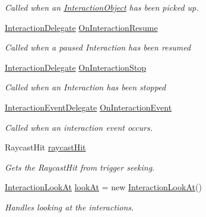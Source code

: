 \begin{DoxyCompactItemize}
\begin{DoxyCompactList}\small\item\em Called when an \mbox{\hyperlink{class_root_motion_1_1_final_i_k_1_1_interaction_object}{Interaction\+Object}} has been picked up. \end{DoxyCompactList}\item 
\mbox{\hyperlink{class_root_motion_1_1_final_i_k_1_1_interaction_system_aa5a8c5136773b4244ab8f7ce707620b7}{Interaction\+Delegate}} \mbox{\hyperlink{class_root_motion_1_1_final_i_k_1_1_interaction_system_a2310c0a686686871aebdce9e8a2cc425}{On\+Interaction\+Resume}}
\begin{DoxyCompactList}\small\item\em Called when a paused Interaction has been resumed \end{DoxyCompactList}\item 
\mbox{\hyperlink{class_root_motion_1_1_final_i_k_1_1_interaction_system_aa5a8c5136773b4244ab8f7ce707620b7}{Interaction\+Delegate}} \mbox{\hyperlink{class_root_motion_1_1_final_i_k_1_1_interaction_system_ac72563333f0d5ca6a76f2ee0662a4b09}{On\+Interaction\+Stop}}
\begin{DoxyCompactList}\small\item\em Called when an Interaction has been stopped \end{DoxyCompactList}\item 
\mbox{\hyperlink{class_root_motion_1_1_final_i_k_1_1_interaction_system_ae04cc230b351d4b73458372899d3f6d8}{Interaction\+Event\+Delegate}} \mbox{\hyperlink{class_root_motion_1_1_final_i_k_1_1_interaction_system_a58f3fbe2e590a55017cb49cfb8de7ebb}{On\+Interaction\+Event}}
\begin{DoxyCompactList}\small\item\em Called when an interaction event occurs. \end{DoxyCompactList}\item 
Raycast\+Hit \mbox{\hyperlink{class_root_motion_1_1_final_i_k_1_1_interaction_system_af84367979dcf4ca8adcde2c6d07e55c5}{raycast\+Hit}}
\begin{DoxyCompactList}\small\item\em Gets the Raycast\+Hit from trigger seeking. \end{DoxyCompactList}\item 
\mbox{\hyperlink{class_root_motion_1_1_final_i_k_1_1_interaction_look_at}{Interaction\+Look\+At}} \mbox{\hyperlink{class_root_motion_1_1_final_i_k_1_1_interaction_system_a25a728acce090cdf0acfcc96ccc7f5dd}{look\+At}} = new \mbox{\hyperlink{class_root_motion_1_1_final_i_k_1_1_interaction_look_at}{Interaction\+Look\+At}}()
\begin{DoxyCompactList}\small\item\em Handles looking at the interactions. \end{DoxyCompactList}\end{DoxyCompactItemize}
